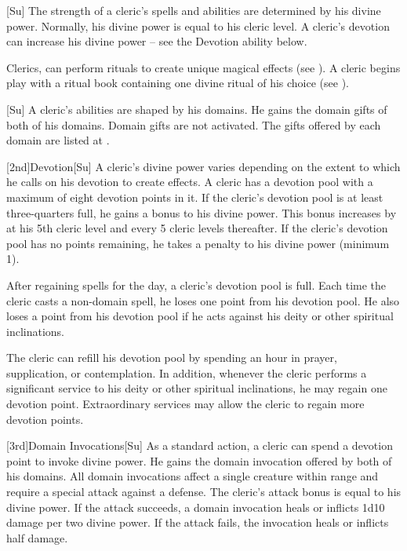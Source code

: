 [Su]
The strength of a cleric's spells and abilities are determined by his divine power.
Normally, his divine power is equal to his cleric level.
A cleric's devotion can increase his divine power -- see the Devotion ability below.

Clerics, can perform rituals to create unique magical effects (see ).
A cleric begins play with a ritual book containing one divine ritual of his choice (see ).

[Su]
A cleric's abilities are shaped by his domains.
He gains the domain gifts of both of his domains.
Domain gifts are not activated.
The gifts offered by each domain are listed at .

[2nd]{Devotion}[Su]
A cleric's divine power varies depending on the extent to which he calls on his devotion to create effects.
A cleric has a devotion pool with a maximum of eight devotion points in it.
If the cleric's devotion pool is at least three-quarters full, he gains a  bonus to his divine power.
This bonus increases by  at his 5th cleric level and every 5 cleric levels thereafter.
If the cleric's devotion pool has no points remaining, he takes a  penalty to his divine power (minimum 1).

After regaining spells for the day, a cleric's devotion pool is full.
Each time the cleric casts a non-domain spell, he loses one point from his devotion pool.
He also loses a point from his devotion pool if he acts against his deity or other spiritual inclinations.

The cleric can refill his devotion pool by spending an hour in prayer, supplication, or contemplation.
In addition, whenever the cleric performs a significant service to his deity or other spiritual inclinations, he may regain one devotion point.
Extraordinary services may allow the cleric to regain more devotion points.

[3rd]{Domain Invocations}[Su]
As a standard action, a cleric can spend a devotion point to invoke divine power.
He gains the domain invocation offered by both of his domains.
All domain invocations affect a single creature within \rngmed range and require a special attack against a defense.
The cleric's attack bonus is equal to his divine power.
If the attack succeeds, a domain invocation heals or inflicts 1d10 damage per two divine power.
If the attack fails, the invocation heals or inflicts half damage.

